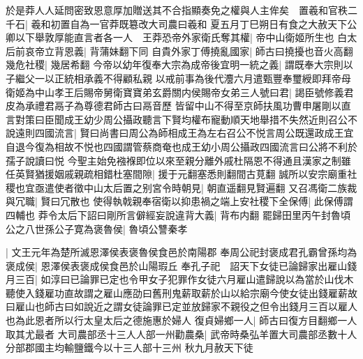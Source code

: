 於是莽人人延問密致恩意厚加贈送其不合指顯奏免之權與人主侔矣　置羲和官秩二千石|{
	羲和初置自為一官莽既簒改大司農曰羲和}
夏五月丁巳朔日有食之大赦天下公卿以下舉敦厚能直言者各一人　王莽恐帝外家衛氏奪其權|{
	帝中山衛姬所生也}
白太后前哀帝立背恩義|{
	背蒲妹翻下同}
自貴外家丁傅撓亂國家|{
	師古曰撓擾也音火高翻}
幾危社稷|{
	幾居希翻}
今帝以幼年復奉大宗為成帝後宜明一統之義|{
	謂既奉大宗則以子繼父一以正統相承義不得顧私親}
以戒前事為後代灋六月遣甄豐奉璽綬即拜帝母衛姬為中山孝王后賜帝舅衛寶寶弟玄爵關内侯賜帝女弟三人號曰君|{
	謁臣號修義君皮為承禮君鬲子為尊德君師古曰鬲音歷}
皆留中山不得至京師扶風功曹申屠剛以直言對策曰臣聞成王幼少周公攝政聽言下賢均權布寵動順天地舉措不失然近則召公不說遠則四國流言|{
	賢曰尚書曰周公為師相成王為左右召公不悦言周公既還政成王宜自退今復為相故不悦也四國謂管蔡商奄也成王幼小周公攝政四國流言曰公將不利於孺子說讀曰悦}
今聖主始免襁褓即位以來至親分離外戚杜隔恩不得通且漢家之制雖任英賢猶援姻戚親疏相錯杜塞間隙|{
	援于元翻塞悉則翻間古莧翻}
誠所以安宗廟重社稷也宜亟遣使者徵中山太后置之别宮令時朝見|{
	朝直遥翻見賢遍翻}
又召馮衛二族裁與冗職|{
	賢曰冗散也}
使得執戟親奉宿衛以抑患禍之端上安社稷下全保傅|{
	此保傅謂四輔也}
莽令太后下詔曰剛所言僻經妄說違背大義|{
	背布内翻}
罷歸田里丙午封魯頃公之八世孫公子寛為褒魯侯|{
	魯頃公讐秦孝}


|{
	文王元年為楚所滅恩澤侯表褒魯侯食邑於南陽郡}
奉周公祀封褒成君孔霸曾孫均為褒成侯|{
	恩澤侯表褒成侯食邑於山陽瑕丘}
奉孔子祀　詔天下女徒已論歸家出雇山錢月三百|{
	如淳曰已論罪已定也令甲女子犯罪作女徒六月雇山遣歸說以為當於山伐木聽使入錢雇功直故謂之雇山應劭曰舊刑鬼薪取薪於山以給宗廟今使女徒出錢雇薪故曰雇山也師古曰如說近之謂女徒論罪已定並放歸家不親役之但令出錢月三百以雇人也為此恩者所以行太皇太后之德施惠於婦人}
復貞婦鄉一人|{
	師古曰復方目翻鄉一人取其尤最者}
大司農部丞十三人人部一州勸農桑|{
	武帝時桑弘羊置大司農部丞數十人分部郡國主均輸鹽鐵今以十三人部十三州}
秋九月赦天下徒


